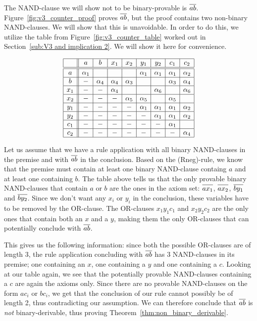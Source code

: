 The NAND-clause we will show not to be binary-provable is $\ol{ab}$.
Figure~\ref{fig:v3_counter_proof} proves $\ol{ab}$, but the proof contains two non-binary NAND-clauses.
We will show that this is unavoidable.
In order to do this, we utilize the table from Figure~\ref{fig:v3_counter_table} worked out in Section~\ref{sub:V3 and implication 2}.
We will show it here for convenience.\par
\begin{figure}[!h]
  \centering
  \[\begin{array}{|c||c|c|c|c|c|c|c|c|}
    \hline
    & a & b & x_1 & x_2 & y_1 & y_2 & c_1 & c_2 \\ \hline\hline
    a & \alpha_1 & & & & \alpha_1 & \alpha_1 & \alpha_1 & \alpha_2 \\ \hline
    b &-& \alpha_4 & \alpha_4 & \alpha_3 & & & \alpha_3 & \alpha_4 \\ \hline
    x_1 &-&-& \alpha_4 & & & \alpha_6 & & \alpha_6 \\ \hline
    x_2 &-&-&-& \alpha_5 & \alpha_5 & & \alpha_5 & \\ \hline
    y_1 &-&-&-&-& \alpha_1 & \alpha_1 & \alpha_1 & \alpha_2 \\ \hline
    y_2 &-&-&-&-&-& \alpha_1 & \alpha_1 & \alpha_2 \\ \hline
    c_1 &-&-&-&-&-&-& \alpha_1 & \\ \hline
    c_2 &-&-&-&-&-&-&-& \alpha_4 \\ \hline
  \end{array}\]
  \caption{}
  \label{fig:open_door_table}
\end{figure}

Let us assume that we have a rule application with all binary NAND-clauses in the premise and with $\ol{ab}$ in the conclusion.
Based on the (Rneg)-rule, we know that the premise must contain at least one binary NAND-clause containg $a$ and at least one containing $b$.
The table above tells us that the only provable binary NAND-clauses that contain $a$ or $b$ are the ones in the axiom set:
$\ol{ax_1}$, $\ol{ax_2}$, $\ol{by_1}$ and $\ol{by_2}$.
Since we don't want any $x_i$ or $y_i$ in the conclusion, these variables have to be removed by the OR-clause.
The OR-clauses $x_1y_1c_1$ and $x_2y_2c_2$ are the only ones that contain both an $x$ and a $y$, making them the only OR-clauses that can potentially conclude with $\ol{ab}$.

This gives us the following information: since both the possible OR-clauses are of length 3, the rule application concluding with $\ol{ab}$ has 3 NAND-clauses in its premise; one containing an $x$, one containing a $y$ and one containing a $c$.
Looking at our table again, we see that the potentially provable NAND-clauses containing a $c$ are again the axioms only.
Since there are no provable NAND-clauses on the form $ac_i$ or $bc_i$, we get that the conclusion of our rule cannot possibly be of length 2, thus contradicting our assumption.
We can therefore conclude that $\ol{ab}$ is \textit{not} binary-derivable, thus proving Theorem~\ref{thm:non_binary_derivable}.

